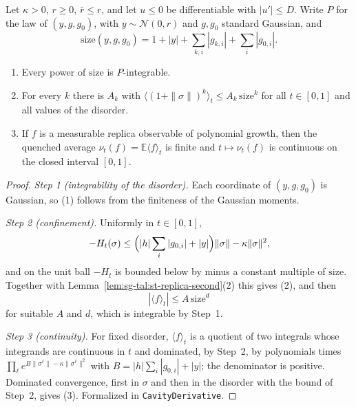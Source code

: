 \begin{lemma}\label{lem:sg-tal:st-cavity-moments}
  \leanok
Let $\kappa>0$, $r\ge0$, $\bar r\le r$, and let $u\le0$ be differentiable with $|u'|\le D$. Write $P$ for the law
of $(y,g,g_0)$, with $y\sim\mathcal N(0,r)$ and $g,g_0$ standard Gaussian, and
\[
\mathrm{size}(y,g,g_0)=1+|y|+\sum_{k,i}|g_{k,i}|+\sum_i|g_{0,i}| .
\]
\begin{enumerate}
\item Every power of $\mathrm{size}$ is $P$-integrable.
\item For every $k$ there is $A_k$ with $\langle(1+\|\sigma\|)^k\rangle_t\le A_k\,\mathrm{size}^k$ for all
$t\in[0,1]$ and all values of the disorder.
\item If $f$ is a measurable replica observable of polynomial growth, then the quenched average
$\nu_t(f)=\mathbb E\langle f\rangle_t$ is finite and $t\mapsto\nu_t(f)$ is continuous on the closed interval
$[0,1]$.
\end{enumerate}
\end{lemma}
\begin{proof}
  \leanok
\emph{Step 1 (integrability of the disorder).} Each coordinate of $(y,g,g_0)$ is Gaussian, so (1) follows from
the finiteness of the Gaussian moments.

\emph{Step 2 (confinement).} Uniformly in $t\in[0,1]$,
\[
-H_t(\sigma)\le\Bigl(|h|\sum_i|g_{0,i}|+|y|\Bigr)\|\sigma\|-\kappa\|\sigma\|^2,
\]
and on the unit ball $-H_t$ is bounded below by minus a constant multiple of $\mathrm{size}$. Together with
Lemma~\ref{lem:sg-tal:st-replica-second}(2) this gives (2), and then
\[
|\langle f\rangle_t|\le A\,\mathrm{size}^{d}
\]
for suitable $A$ and $d$, which is integrable by Step~1.

\emph{Step 3 (continuity).} For fixed disorder, $\langle f\rangle_t$ is a quotient of two integrals whose
integrands are continuous in $t$ and dominated, by Step~2, by polynomials times
$\prod_\ell e^{B\|\sigma^\ell\|-\kappa\|\sigma^\ell\|^2}$ with $B=|h|\sum_i|g_{0,i}|+|y|$; the denominator is
positive. Dominated convergence, first in $\sigma$ and then in the disorder with the bound of Step~2, gives (3).
Formalized in \texttt{CavityDerivative}.
\end{proof}

